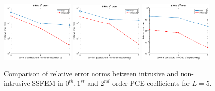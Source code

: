 \documentclass[letter,1p,11pt,oneside,onecolumn,sort&compress]{elsarticle}
\begin{document}
\begin{figure}[htbp]
\centering
 \includegraphics[width=0.32\textwidth,height=0.18\textheight]{plots/sigma04_5RN_u0_order0.eps}
 \includegraphics[width=0.32\textwidth,height=0.18\textheight]{plots/sigma04_5RN_u3_order1.eps}
 \includegraphics[width=0.32\textwidth,height=0.18\textheight]{plots/sigma04_5RN_u12_order2.eps}
 \caption{Comparison of relative error norms between intrusive and non-intrusive SSFEM in $0^{th}, 1^{st}$ and $2^{nd}$ order PCE coefficients for $L=5$.}
 \label{fig:5RV}
\end{figure}
\end{document}
